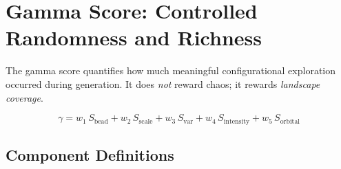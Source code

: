 \documentclass[11pt]{article}
\newcommand{\svar}[1]{\ensuremath{S_{\mathrm{#1}}}}
\begin{document}
\section{Gamma Score: Controlled Randomness and Richness}
\label{sec:gamma}

The gamma score quantifies how much meaningful configurational exploration
occurred during generation.
It does \emph{not} reward chaos; it rewards \emph{landscape coverage}.

\begin{equation}
  \label{eq:gamma}
  \boxed{
  \gamma = w_1\,\svar{bead}
         + w_2\,\svar{scale}
         + w_3\,\svar{var}
         + w_4\,\svar{intensity}
         + w_5\,\svar{orbital}
  }
\end{equation}

\subsection{Component Definitions}
\end{document}
